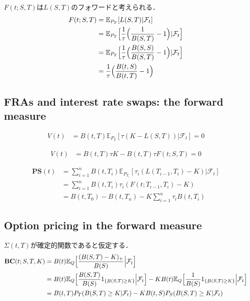 \documentclass[11pt, a4paper]{jsarticle}
\newcommand{\E}{\mathbb{E}}
\newcommand{\PS}{\textbf{PS}}
\newcommand{\BC}{\textbf{BC}}
\begin{document}
$F(t; S, T)$は$L(S, T)$のフォワードと考えられる．
\begin{align}
F(t; S, T)
& =
\E_{P_T} [ L(S, T) | \mathcal{F}_t ] \nonumber \\
& =
\E_{P_T} \Bigl[ \frac{1}{\tau} \Bigl( \frac{1}{B(S, T)} - 1 \Bigr) | \mathcal{F}_t \Bigr] \nonumber \\
& =
\E_{P_T} \Bigl[ \frac{1}{\tau} \Bigl( \frac{B(S, S)}{B(S, T)} - 1 \Bigr) | \mathcal{F}_t \Bigr] \nonumber \\
& =
\frac{1}{\tau} \Bigl( \frac{B(t, S)}{B(t, T)} - 1 \Bigr) \nonumber
\end{align}

\subsection{FRAs and interest rate swaps: the forward measure}
\begin{align}
V(t)
& =
B(t, T) \E_{P_T} [ \tau (K - L(S, T)) | \mathcal{F}_t ] = 0 \nonumber
\end{align}

\begin{align}
V(t)
& =
B(t, T) \tau K - B(t, T) \tau F(t; S, T) = 0 \nonumber
\end{align}

\begin{align}
\PS(t)
& =
\sum_{i=1}^n B(t, T_i) \E_{P_{T_i}} [ \tau_i (L(T_{i-1}, T_i) - K) | \mathcal{F}_t ] \nonumber \\
& =
\sum_{i=1}^n B(t, T_i) \tau_i (F(t; T_{i-1}, T_i) - K) \nonumber \\
& =
B(t, T_0) - B(t, T_n) - K \sum_{i=1}^n \tau_i B(t, T_i) \nonumber
\end{align}

\subsection{Option pricing in the forward measure}
$\Sigma(t, T)$が確定的関数であると仮定する．
\begin{align}
\BC(t; S, T, K)
& =
B(t) \E_Q \Bigl[ \frac{(B(S, T) - K)_+}{B(S)} \Bigl| \mathcal{F}_t \Bigr] \nonumber \\
& =
B(t) \E_Q \Bigl[ \frac{B(S, T)}{B(S)} 1_{\{ B(S, T) \geq K \}} \Bigl| \mathcal{F}_t \Bigr]
- K B(t) \E_Q \Bigl[ \frac{1}{B(S)} 1_{\{ B(S, T) \geq K \}} \Bigl| \mathcal{F}_t \Bigr] \nonumber \\
& =
B(t, T) P_T (B(S, T) \geq K | \mathcal{F}_t) - K B(t, S) P_S (B(S, T) \geq K | \mathcal{F}_t) \nonumber
\end{align}
\end{document}
